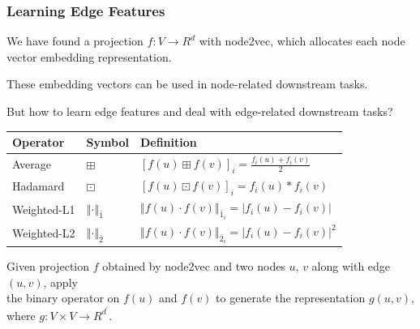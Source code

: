 \documentclass[notes, 10pt, aspectratio=169]{beamer}
\begin{document}
\begin{frame}
    \frametitle{Learning Edge Features}
    We have found a projection $f: V\rightarrow R^d$ with node2vec, which allocates each node vector embedding representation.\par \vspace{0.2cm}
    These embedding vectors can be used in node-related downstream tasks.\par \vspace{0.2cm}
    But how to learn edge features and deal with edge-related downstream tasks?\pause
    \begin{center}
        \begin{tabular}{lll}
            \toprule
            \textbf{Operator} & \textbf{Symbol} & \textbf{Definition}\\
            \midrule
            Average & $\boxplus$ & $\left[ f(u)\boxplus f(v) \right]_i = \frac{f_i(u) + f_i(v)}{2}$\\
            Hadamard & $\boxdot$ & $\left[ f(u)\boxdot f(v) \right]_i = f_i(u) \ast f_i(v) $\\
            Weighted-L1 & $\left\Vert \cdot \right\Vert_{\bar{1}}$ & $\left\Vert f(u) \cdot f(v) \right\Vert_{\bar{1}_i} = \left| f_i(u) - f_i(v) \right|$  \\ 
            Weighted-L2 & $\left\Vert \cdot \right\Vert_{\bar{2}}$ & $\left\Vert f(u) \cdot f(v) \right\Vert_{\bar{2}_i} = \left| f_i(u) - f_i(v) \right|^2$\\
            \bottomrule
        \end{tabular}
    \end{center}
    Given projection $f$ obtained by node2vec and two nodes $u$, $v$ along with edge $(u,v)$, apply \\ the binary operator on $f(u)$ and $f(v)$ to generate the representation $g(u,v)$, where $g: V\times V\rightarrow R^{d^{'}}$.
\end{frame}
\end{document}
